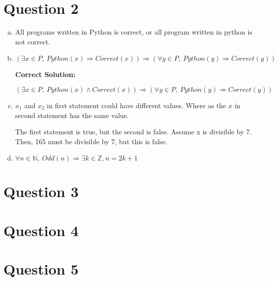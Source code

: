 \documentclass[12pt]{article}
\begin{document}
\section*{Question 2}
\begin{enumerate}[a.]
    \item

    All programs written in Python is correct, or all program written in python
    is not correct.

    \item

    $(\exists x \in P,\:Python(x) \Rightarrow Correct(x)) \Rightarrow (\forall y
    \in P,\:Python(y) \Rightarrow Correct(y))$

    \bigskip

    \textbf{Correct Solution:}

    $(\exists x \in P,\:Python(x) \land Correct(x)) \Rightarrow (\forall y \in P,\:
    Python(y) \Rightarrow Correct(y))$

    \item

    $x_1$ and $x_2$ in first statement could have different values. Where as the $x$ in
    second statement has the same value.

    \bigskip

    The first statement is true, but the second is false. Assume x is divisible by 7.
    Then, 165 must be divisible by 7, but this is false.

    \item

    $\forall n \in \mathbb{N},\:Odd(n) \Rightarrow \exists k \in \mathbb{Z}, n = 2k + 1$

\end{enumerate}

\section*{Question 3}

\section*{Question 4}

\section*{Question 5}
\end{document}
